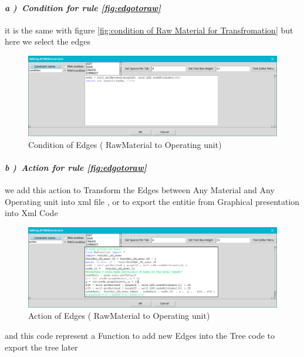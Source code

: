 \pagebreak
\paragraph{\emph{ a )~Condition for rule \ref{fig:edgotoraw} } } it is the same with figure \ref{fig:condition of Raw Material for Transfromation} but here we select the edges

\vspace{1cm} 
\begin{figure}[th]
	\centering  %
 	\includegraphics[scale=0.8]{Chapiter3/img/xcond2}
	\caption{\label{fig:Condition2)}Condition of Edges ( RawMaterial to Operating unit)}
 \end{figure} 
\vspace{1cm}
\paragraph{\emph{ b )~Action for rule \ref{fig:edgotoraw} } }  we add this action to  Transform the Edges between Any Material and Any Operating unit into xml file  , or to export the entitie from Graphical presentation 
into Xml Code  
\pagebreak 


\begin{figure}[th]
	\centering  %
 	\includegraphics[scale=0.8]{Chapiter3/img/xact2}
	\caption{\label{fig:action2)}Action of Edges ( RawMaterial to Operating unit)}
\end{figure}  

and this code represent a Function to add new Edges into the Tree code 
to export the tree later 

